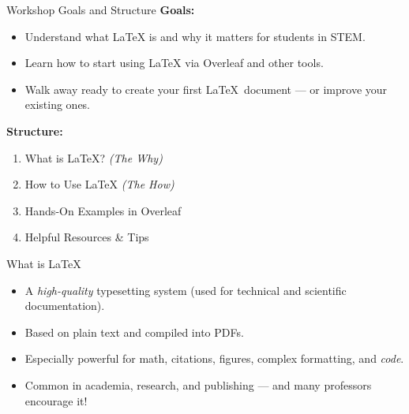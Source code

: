 \documentclass[x11names]{beamer} %
\begin{document}
\begin{frame}{Workshop Goals and Structure}
    \textbf{Goals:}
    \begin{itemize}
        \item Understand what \LaTeX{} is and why it matters for students in STEM.
        \item Learn how to start using \LaTeX{} via Overleaf and other tools.
        \item Walk away ready to create your first \LaTeX\ document — or improve your existing ones.
    \end{itemize}
    \textbf{Structure:}
    \begin{enumerate}
        \item What is \LaTeX{}? \textit{(The Why)}
        \item How to Use \LaTeX{} \textit{(The How)}
        \item Hands-On Examples in Overleaf
        \item Helpful Resources \& Tips
    \end{enumerate}
\end{frame}

\begin{frame}{What is \LaTeX{}} 
\begin{itemize}
    \item A \textit{high-quality} typesetting system (used for technical and scientific documentation).
    \item Based on plain text and compiled into PDFs.
    \item Especially powerful for math, citations, figures, complex formatting, and \textit{code}.
    \item Common in academia, research, and publishing — and many professors encourage it!
\end{itemize}
\end{frame}
\end{document}
